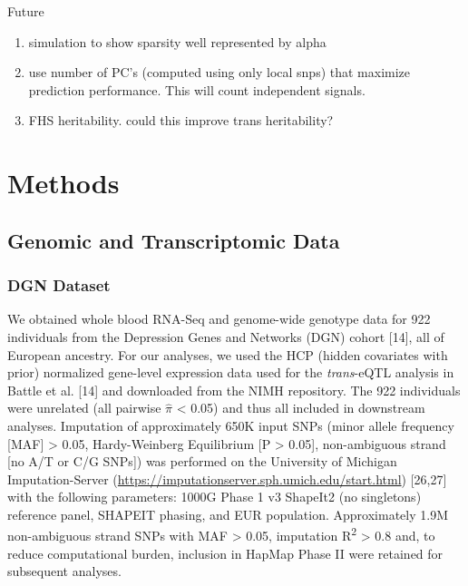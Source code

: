 \documentclass[]{article}
\begin{document}
Future

\begin{enumerate}
\def\labelenumi{\arabic{enumi}.}
\itemsep1pt\parskip0pt
\item
  simulation to show sparsity well represented by alpha
\item
  use number of PC's (computed using only local snps) that maximize
  prediction performance. This will count independent signals.
\item
  FHS heritability. could this improve trans heritability?
\end{enumerate}

\section{Methods}\label{methods}

\subsection{Genomic and Transcriptomic
Data}\label{genomic-and-transcriptomic-data}

\subsubsection{DGN Dataset}\label{dgn-dataset}

We obtained whole blood RNA-Seq and genome-wide genotype data for 922
individuals from the Depression Genes and Networks (DGN) cohort
{[}14{]}, all of European ancestry. For our analyses, we used the HCP
(hidden covariates with prior) normalized gene-level expression data
used for the \emph{trans}-eQTL analysis in Battle et al. {[}14{]} and
downloaded from the NIMH repository. The 922 individuals were unrelated
(all pairwise \(\hat{\pi}\) \textless{} 0.05) and thus all included in
downstream analyses. Imputation of approximately 650K input SNPs (minor
allele frequency {[}MAF{]} \textgreater{} 0.05, Hardy-Weinberg
Equilibrium {[}P \textgreater{} 0.05{]}, non-ambiguous strand {[}no A/T
or C/G SNPs{]}) was performed on the University of Michigan
Imputation-Server
(\url{https://imputationserver.sph.umich.edu/start.html}) {[}26,27{]}
with the following parameters: 1000G Phase 1 v3 ShapeIt2 (no singletons)
reference panel, SHAPEIT phasing, and EUR population. Approximately 1.9M
non-ambiguous strand SNPs with MAF \textgreater{} 0.05, imputation
R\textsuperscript{2} \textgreater{} 0.8 and, to reduce computational
burden, inclusion in HapMap Phase II were retained for subsequent
analyses.
\end{document}
